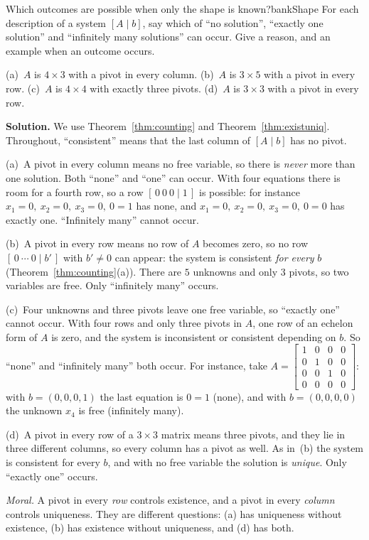 \documentclass[11pt]{article}
\begin{document}
\begin{exmp}{Which outcomes are possible when only the shape is known?}{bankShape}
For each description of a system $[A\mid b]$, say which of ``no solution'', ``exactly one solution'' and ``infinitely many solutions'' can occur. Give a reason, and an example when an outcome occurs.

(a)~$A$ is $4\times3$ with a pivot in every column. \quad (b)~$A$ is $3\times5$ with a pivot in every row. \quad (c)~$A$ is $4\times4$ with exactly three pivots. \quad (d)~$A$ is $3\times3$ with a pivot in every row.

\textbf{Solution.} We use Theorem~\ref{thm:counting} and Theorem~\ref{thm:existuniq}. Throughout, ``consistent'' means that the last column of $[A\mid b]$ has no pivot.

(a)~A pivot in every column means no free variable, so there is \emph{never} more than one solution. Both ``none'' and ``one'' can occur. With four equations there is room for a fourth row, so a row $[\,0\ 0\ 0\mid1\,]$ is possible: for instance $x_1=0,\ x_2=0,\ x_3=0,\ 0=1$ has none, and $x_1=0,\ x_2=0,\ x_3=0,\ 0=0$ has exactly one. ``Infinitely many'' cannot occur.

(b)~A pivot in every row means no row of $A$ becomes zero, so no row $[\,0\ \cdots\ 0\mid b'\,]$ with $b'\neq0$ can appear: the system is consistent \emph{for every} $b$ (Theorem~\ref{thm:counting}(a)). There are $5$ unknowns and only $3$ pivots, so two variables are free. Only ``infinitely many'' occurs.

(c)~Four unknowns and three pivots leave one free variable, so ``exactly one'' cannot occur. With four rows and only three pivots in $A$, one row of an echelon form of $A$ is zero, and the system is inconsistent or consistent depending on $b$. So ``none'' and ``infinitely many'' both occur. For instance, take $A=\begin{bmatrix}1&0&0&0\\0&1&0&0\\0&0&1&0\\0&0&0&0\end{bmatrix}$: with $b=(0,0,0,1)$ the last equation is $0=1$ (none), and with $b=(0,0,0,0)$ the unknown $x_4$ is free (infinitely many).

(d)~A pivot in every row of a $3\times3$ matrix means three pivots, and they lie in three different columns, so every column has a pivot as well. As in~(b) the system is consistent for every $b$, and with no free variable the solution is \emph{unique}. Only ``exactly one'' occurs.

\emph{Moral.} A pivot in every \emph{row} controls existence, and a pivot in every \emph{column} controls uniqueness. They are different questions: (a) has uniqueness without existence, (b) has existence without uniqueness, and (d) has both.
\end{exmp}
\end{document}
